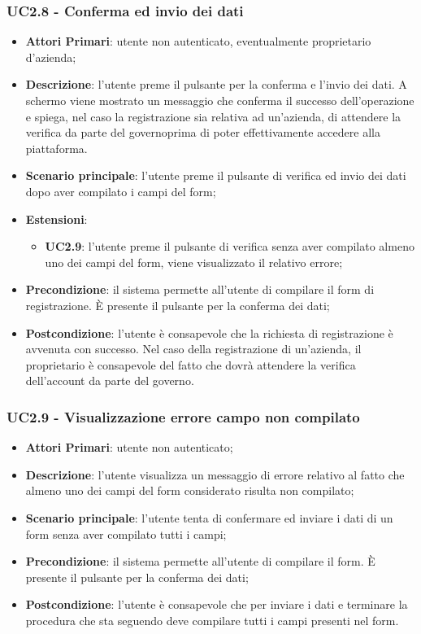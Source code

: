\subsubsection{UC2.8 - Conferma ed invio dei dati}
\begin{itemize}
	\item \textbf{Attori Primari}: utente non autenticato, eventualmente proprietario d'azienda;
	\item \textbf{Descrizione}:
	l'utente preme il pulsante per la conferma e l'invio dei dati. A schermo viene mostrato un messaggio che conferma il successo dell'operazione e spiega, nel caso la registrazione sia relativa ad un'azienda, di attendere la verifica da parte del governo\glosp prima di poter effettivamente accedere alla piattaforma.
	\item \textbf{Scenario principale}: l'utente preme il pulsante di verifica ed invio dei dati dopo aver compilato i campi del form;
	\item \textbf{Estensioni}: 
	\begin{itemize}
		\item \textbf{UC2.9}: l'utente preme il pulsante di verifica senza aver compilato almeno uno dei campi del form, viene visualizzato il relativo errore;
	\end{itemize}
	\item \textbf{Precondizione}: il sistema permette all'utente di compilare il form di registrazione. \`E presente il pulsante per la conferma dei dati;
	\item \textbf{Postcondizione}:
	l'utente è consapevole che la richiesta di registrazione è avvenuta con successo. Nel caso della registrazione di un'azienda, il proprietario è consapevole del fatto che dovrà attendere la verifica dell'account da parte del governo\glosp.
\end{itemize}

\subsubsection{UC2.9 - Visualizzazione errore campo non compilato}
\begin{itemize}
	\item \textbf{Attori Primari}: utente non autenticato;
	\item \textbf{Descrizione}:
	l'utente visualizza un messaggio di errore relativo al fatto che almeno uno dei campi del form considerato risulta non compilato;
	\item \textbf{Scenario principale}: l'utente tenta di confermare ed inviare i dati di un form senza aver compilato tutti i campi;
	\item \textbf{Precondizione}: il sistema permette all'utente di compilare il form. \`E presente il pulsante per la conferma dei dati;
	\item \textbf{Postcondizione}:
	l'utente è consapevole che per inviare i dati e terminare la procedura che sta seguendo deve compilare tutti i campi presenti nel form.
\end{itemize}
